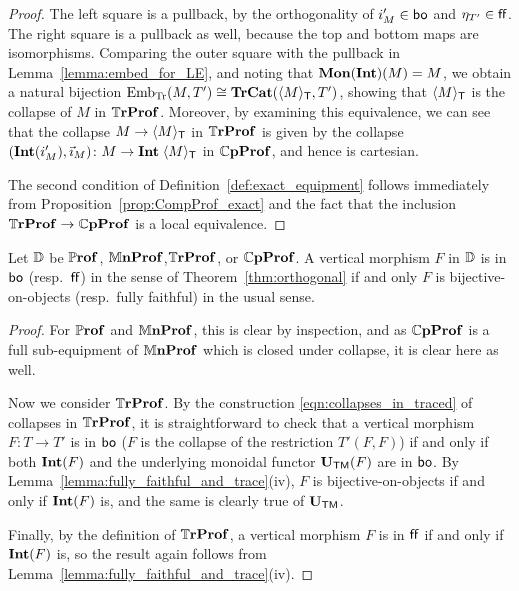 \documentclass[11pt,oneside,article]{memoir}
\begin{document}
\begin{proof}
   The left square is a pullback, by the orthogonality of $i'_M\in\mathsf{bo}$ and $\eta_{T'}\in\mathsf{ff}$. The
   right square is a pullback as well, because the top and bottom maps are isomorphisms. Comparing
   the outer square with the pullback in Lemma~\ref{lemma:embed_for_LE}, and noting that
   $\mathbf{Mon}(\mathbf{Int})(M)=M$, we obtain a natural bijection
   $\mathrm{Emb}_{\mathrm{Tr}}(M,T')\cong\mathbf{TrCat}(\langle M\rangle_{\mathsf{T}},T')$, showing that
   $\langle M\rangle_{\mathsf{T}}$ is the collapse of $M$ in $\mathbb{T}\mathbf{rProf}$. Moreover, by examining this
   equivalence, we can see that the collapse $M\to \langle M\rangle_{\mathsf{T}}$ in $\mathbb{T}\mathbf{rProf}$ is given by
   the collapse $(\mathbf{Int}(i'_M),\vec{\imath}_M)\colon M\to\mathbf{Int}\;\langle M\rangle_{\mathsf{T}}$ in $\mathbb{C}\mathbf{pProf}$,
   and hence is cartesian.

   The second condition of Definition~\ref{def:exact_equipment} follows immediately from
   Proposition~\ref{prop:CompProf_exact} and the fact that the inclusion $\mathbb{T}\mathbf{rProf}\to\mathbb{C}\mathbf{pProf}$ is
   a local equivalence.
\end{proof}

\begin{proposition}
      \label{prop:boff_well_named}
   Let $\mathbb{D}$ be $\mathbb{P}\mathbf{rof}$, $\mathbb{M}\mathbf{nProf}$,$\mathbb{T}\mathbf{rProf}$, or $\mathbb{C}\mathbf{pProf}$. A vertical morphism $F$ in
   $\mathbb{D}$ is in $\mathsf{bo}$ (resp.\ $\mathsf{ff}$) in the sense of Theorem~\ref{thm:orthogonal} if and only $F$
   is bijective-on-objects (resp.\ fully faithful) in the usual sense.
\end{proposition}
\begin{proof}
   For $\mathbb{P}\mathbf{rof}$ and $\mathbb{M}\mathbf{nProf}$, this is clear by inspection, and as $\mathbb{C}\mathbf{pProf}$ is a full
   sub-equipment of $\mathbb{M}\mathbf{nProf}$ which is closed under collapse, it is clear here as well.

   Now we consider $\mathbb{T}\mathbf{rProf}$. By the construction \eqref{eqn:collapses_in_traced} of collapses in
   $\mathbb{T}\mathbf{rProf}$, it is straightforward to check that a vertical morphism $F\colon T\to T'$ is in $\mathsf{bo}$
   ($F$ is the collapse of the restriction $T'(F,F)$) if and only if both $\mathbf{Int}(F)$ and the
   underlying monoidal functor $\mathbf{U}_{\mathsf{TM}}(F)$ are in $\mathsf{bo}$. By
   Lemma~\ref{lemma:fully_faithful_and_trace}(iv), $F$ is bijective-on-objects if and only if
   $\mathbf{Int}(F)$ is, and the same is clearly true of $\mathbf{U}_{\mathsf{TM}}$.

   Finally, by the definition of $\mathbb{T}\mathbf{rProf}$, a vertical morphism $F$ is in $\mathsf{ff}$ if and only if
   $\mathbf{Int}(F)$ is, so the result again follows from Lemma~\ref{lemma:fully_faithful_and_trace}(iv).
\end{proof}
\end{document}
